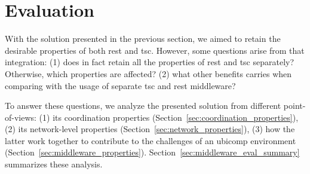 \section{Evaluation}
\label{sec:middleware_qualitative_evaluation}

With the solution presented in the previous section, we aimed to retain the desirable properties of both \ac{rest} and \ac{tsc}.
However, some questions arise from that integration:
(1) does in fact retain all the properties of \ac{rest} and \ac{tsc} separately? Otherwise, which properties are affected?
(2) what other benefits carries when comparing with the usage of separate \ac{tsc} and \ac{rest} middleware?



To answer these questions, we analyze the presented solution from different point-of-views:
(1) its coordination properties (Section~\ref{sec:coordination_properties}),
(2) its network-level properties (Section~\ref{sec:network_properties}),
(3) how the latter work together to contribute to the challenges of an \ac{ubicomp} environment (Section~\ref{sec:middleware_properties}).
Section~\ref{sec:middleware_eval_summary} summarizes these analysis. %


